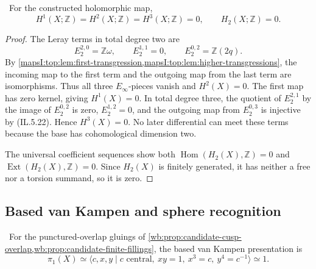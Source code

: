 \begin{theorem}
\label{mapsI:top:thm:h2-vanishing}
\ For the constructed holomorphic map,
\[
 H^1(X;\mathbb Z)=H^2(X;\mathbb Z)=H^3(X;\mathbb Z)=0,
 \qquad H_2(X;\mathbb Z)=0.
\tag{IL.5.23}
\]
\end{theorem}

\begin{proof}
The Leray terms in total degree two are
\[
E_2^{2,0}=\mathbb Z\omega,\qquad E_2^{1,1}=0,\qquad
E_2^{0,2}=\mathbb Z(2q).
\]
By \cref{mapsI:top:lem:first-transgression,mapsI:top:lem:higher-transgressions}, the incoming
map to the first term and the outgoing map from the last term are
isomorphisms.  Thus all three \(E_\infty\)-pieces vanish and \(H^2(X)=0\).
The first map has zero kernel, giving \(H^1(X)=0\).  In total degree three,
the quotient of \(E_2^{2,1}\) by the image of \(E_2^{0,2}\) is zero,
\(E_2^{1,2}=0\), and the outgoing map from \(E_2^{0,3}\) is injective by
(IL.5.22).  Hence \(H^3(X)=0\).  No later differential can meet these terms
because the base has cohomological dimension two.

The universal coefficient sequences show both
\(\operatorname{Hom}(H_2(X),\mathbb Z)=0\) and
\(\operatorname{Ext}(H_2(X),\mathbb Z)=0\).  Since \(H_2(X)\) is finitely
generated, it has neither a free nor a torsion summand, so it is zero.
\end{proof}

\subsection{Based van Kampen and sphere recognition}

\begin{proposition}
\label{mapsI:top:prop:geometric-pi1}
\ For the punctured-overlap gluings of
\cref{wb:prop:candidate-cusp-overlap,wb:prop:candidate-finite-fillings}, the based
van Kampen presentation is
\[
 \pi_1(X)\simeq
 \langle c,x,y\mid c\text{ central},\ xy=1,\ x^3=c,\ y^4=c^{-1}\rangle
 \simeq1.
\tag{IL.5.24}
\]
\end{proposition}

